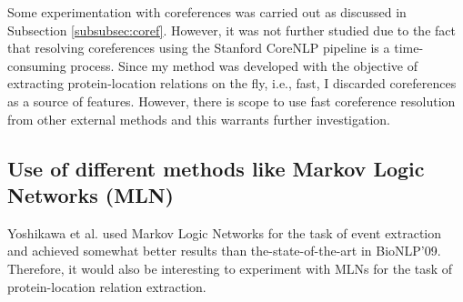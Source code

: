 Some experimentation with coreferences was carried out as discussed in Subsection \ref{subsubsec:coref}. However, it was not further studied due to the fact that resolving coreferences using the Stanford CoreNLP pipeline \cite{manning2014stanford} is a time-consuming process. Since my method was developed with the objective of extracting protein-location relations on the fly, i.e., fast, I discarded coreferences as a source of features. However, there is scope to use fast coreference resolution from other external methods and this warrants further investigation.

\subsection{Use of different methods like Markov Logic Networks (MLN)}

Yoshikawa et al. used Markov Logic Networks \cite{yoshikawa2011coreference} for the task of event extraction and achieved somewhat better results than the-state-of-the-art in BioNLP'09. Therefore, it would also be interesting to experiment with MLNs for the task of protein-location relation extraction.
